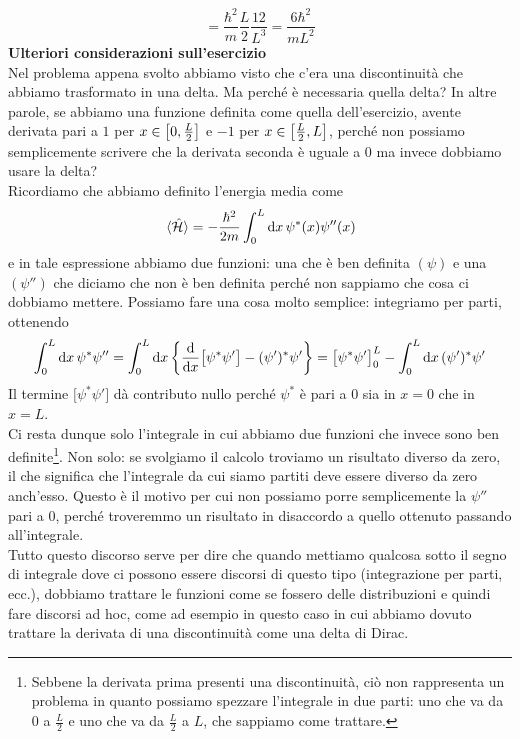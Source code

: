 \begin{soluzione}
\begin{equation*}
      =\frac{\hbar^2}{m}\frac{L}{2} \frac{12}{L^3}
      =\frac{6\hbar^2}{mL^2}
   \end{equation*}
   \vspace{0.2cm}\textbf{Ulteriori considerazioni sull'esercizio}\\
   Nel problema appena svolto abbiamo visto che c'era una discontinuità che abbiamo trasformato in una delta. Ma perché è necessaria quella delta? In altre parole, se abbiamo una funzione definita come quella dell'esercizio, avente derivata pari a $1$ per $x \in \qty[0,\frac{L}{2}]$ e $-1$ per $x \in \qty[\frac{L}{2},L]$, perché non possiamo semplicemente scrivere che la derivata seconda è uguale a 0 ma invece dobbiamo usare la delta?\\
   Ricordiamo che abbiamo definito l'energia media come
   \begin{equation*}
      \expval*{\hat{\mathcal{H}}}
      =-\frac{\hbar^2}{2m} \int_{0}^{L} \dd{x} \psi^*(x) \psi''(x)
   \end{equation*}
   e in tale espressione abbiamo due funzioni: una che è ben definita $(\psi)$ e una $(\psi'')$ che diciamo che non è ben definita perché non sappiamo che cosa ci dobbiamo mettere. Possiamo fare una cosa molto semplice: integriamo per parti, ottenendo
   \begin{equation*}
      \int_{0}^{L} \dd{x} \psi^* \psi''
      =\int_{0}^{L} \dd{x} \qty{ \dv{x} \big[ \psi^*\psi' \big] - (\psi')^*\psi' }
      =\big[ \psi^*\psi' \big]_{0}^{L} - \int_{0}^{L} \dd{x} (\psi')^*\psi' 
   \end{equation*}
   Il termine $\big[ \psi^*\psi' \big]$ dà contributo nullo perché $\psi^*$ è pari a 0 sia in $x=0$ che in $x=L$.\\
   Ci resta dunque solo l'integrale in cui abbiamo due funzioni che invece sono ben definite\footnote{Sebbene la derivata prima presenti una discontinuità, ciò non rappresenta un problema in quanto possiamo spezzare l'integrale in due parti: uno che va da $0$ a $\frac{L}{2}$ e uno che va da $\frac{L}{2}$ a $L$, che sappiamo come trattare.}. Non solo: se svolgiamo il calcolo troviamo un risultato diverso da zero, il che significa che l'integrale da cui siamo partiti deve essere diverso da zero anch'esso. Questo è il motivo per cui non possiamo porre semplicemente la $\psi''$ pari a 0, perché troveremmo un risultato in disaccordo a quello ottenuto passando all'integrale.\\
   Tutto questo discorso serve per dire che quando mettiamo qualcosa sotto il segno di integrale dove ci possono essere discorsi di questo tipo (integrazione per parti, ecc.), dobbiamo trattare le funzioni come se fossero delle distribuzioni e quindi fare discorsi ad hoc, come ad esempio in questo caso in cui abbiamo dovuto trattare la derivata di una discontinuità come una delta di Dirac.\\[0.2cm]

\end{soluzione}
